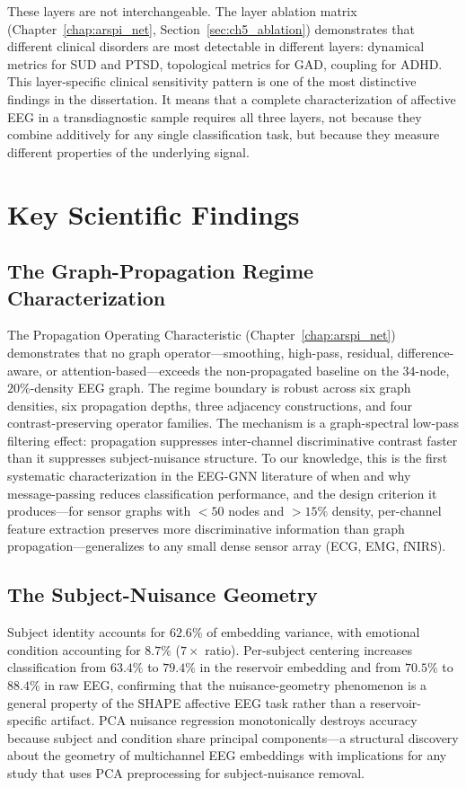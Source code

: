 These layers are not interchangeable. The layer ablation matrix (Chapter~\ref{chap:arspi_net}, Section~\ref{sec:ch5_ablation}) demonstrates that different clinical disorders are most detectable in different layers: dynamical metrics for SUD and PTSD, topological metrics for GAD, coupling for ADHD. This layer-specific clinical sensitivity pattern is one of the most distinctive findings in the dissertation. It means that a complete characterization of affective EEG in a transdiagnostic sample requires all three layers, not because they combine additively for any single classification task, but because they measure different properties of the underlying signal.


\section{Key Scientific Findings}

\subsection{The Graph-Propagation Regime Characterization}

The Propagation Operating Characteristic (Chapter~\ref{chap:arspi_net}) demonstrates that no graph operator---smoothing, high-pass, residual, difference-aware, or attention-based---exceeds the non-propagated baseline on the $34$-node, $20\%$-density EEG graph. The regime boundary is robust across six graph densities, six propagation depths, three adjacency constructions, and four contrast-preserving operator families. The mechanism is a graph-spectral low-pass filtering effect: propagation suppresses inter-channel discriminative contrast faster than it suppresses subject-nuisance structure. To our knowledge, this is the first systematic characterization in the EEG-GNN literature of when and why message-passing reduces classification performance, and the design criterion it produces---for sensor graphs with $< 50$ nodes and $> 15\%$ density, per-channel feature extraction preserves more discriminative information than graph propagation---generalizes to any small dense sensor array (ECG, EMG, fNIRS).

\subsection{The Subject-Nuisance Geometry}

Subject identity accounts for $62.6\%$ of embedding variance, with emotional condition accounting for $8.7\%$ ($7\times$ ratio). Per-subject centering increases classification from $63.4\%$ to $79.4\%$ in the reservoir embedding and from $70.5\%$ to $88.4\%$ in raw EEG, confirming that the nuisance-geometry phenomenon is a general property of the SHAPE affective EEG task rather than a reservoir-specific artifact. PCA nuisance regression monotonically destroys accuracy because subject and condition share principal components---a structural discovery about the geometry of multichannel EEG embeddings with implications for any study that uses PCA preprocessing for subject-nuisance removal.

